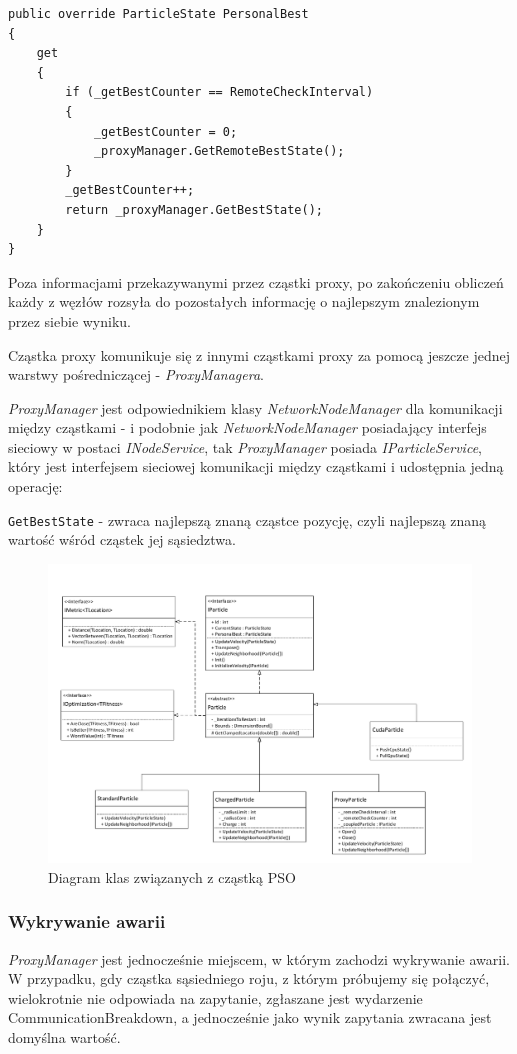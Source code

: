 \documentclass[12pt, twoside, openany, abstract=on]{report}
\theoremstyle{definition}
\begin{document}
\lstset{style=sharpc}
\begin{lstlisting}[frame=single]
public override ParticleState PersonalBest
{
	get
	{
		if (_getBestCounter == RemoteCheckInterval)
		{
			_getBestCounter = 0;
			_proxyManager.GetRemoteBestState();
		}
		_getBestCounter++;
		return _proxyManager.GetBestState();
	}
}
\end{lstlisting}


Poza informacjami przekazywanymi przez cząstki proxy, po zakończeniu obliczeń każdy z węzłów rozsyła do pozostałych informację o najlepszym znalezionym przez siebie wyniku.

Cząstka proxy komunikuje się z innymi cząstkami proxy za pomocą jeszcze jednej warstwy pośredniczącej - \textit{ProxyManagera}.

\textit{ProxyManager} jest odpowiednikiem klasy \textit{NetworkNodeManager} dla komunikacji między cząstkami - i podobnie jak \textit{NetworkNodeManager} posiadający interfejs sieciowy w postaci \textit{INodeService}, tak \textit{ProxyManager} posiada \textit{IParticleService}, który jest interfejsem sieciowej komunikacji między cząstkami i udostępnia jedną operację:

\texttt{GetBestState} - zwraca najlepszą znaną cząstce pozycję, czyli najlepszą znaną wartość wśród cząstek jej sąsiedztwa.

\begin{figure}[H]
    \centering
    \includegraphics[scale=0.65]{particleDiagram.pdf} 
 \caption{Diagram klas związanych z cząstką PSO}
\end{figure}

\subsubsection{Wykrywanie awarii}
\textit{ProxyManager} jest jednocześnie miejscem, w którym zachodzi wykrywanie awarii. W przypadku, gdy cząstka sąsiedniego roju, z którym próbujemy się połączyć, wielokrotnie nie odpowiada na zapytanie, zgłaszane jest wydarzenie CommunicationBreakdown, a jednocześnie jako wynik zapytania zwracana jest domyślna wartość.
\end{document}
